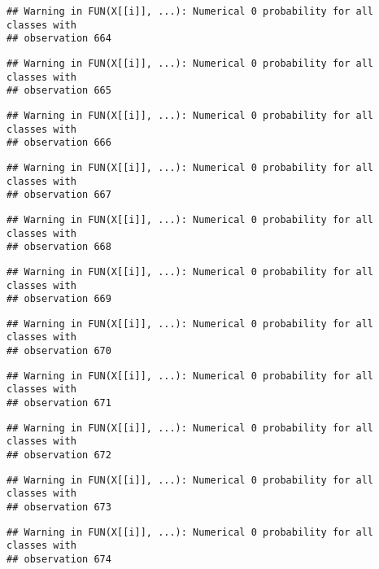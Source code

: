 \documentclass[
]{article}
\begin{document}
\begin{verbatim}
## Warning in FUN(X[[i]], ...): Numerical 0 probability for all classes with
## observation 664
\end{verbatim}

\begin{verbatim}
## Warning in FUN(X[[i]], ...): Numerical 0 probability for all classes with
## observation 665
\end{verbatim}

\begin{verbatim}
## Warning in FUN(X[[i]], ...): Numerical 0 probability for all classes with
## observation 666
\end{verbatim}

\begin{verbatim}
## Warning in FUN(X[[i]], ...): Numerical 0 probability for all classes with
## observation 667
\end{verbatim}

\begin{verbatim}
## Warning in FUN(X[[i]], ...): Numerical 0 probability for all classes with
## observation 668
\end{verbatim}

\begin{verbatim}
## Warning in FUN(X[[i]], ...): Numerical 0 probability for all classes with
## observation 669
\end{verbatim}

\begin{verbatim}
## Warning in FUN(X[[i]], ...): Numerical 0 probability for all classes with
## observation 670
\end{verbatim}

\begin{verbatim}
## Warning in FUN(X[[i]], ...): Numerical 0 probability for all classes with
## observation 671
\end{verbatim}

\begin{verbatim}
## Warning in FUN(X[[i]], ...): Numerical 0 probability for all classes with
## observation 672
\end{verbatim}

\begin{verbatim}
## Warning in FUN(X[[i]], ...): Numerical 0 probability for all classes with
## observation 673
\end{verbatim}

\begin{verbatim}
## Warning in FUN(X[[i]], ...): Numerical 0 probability for all classes with
## observation 674
\end{verbatim}
\end{document}
